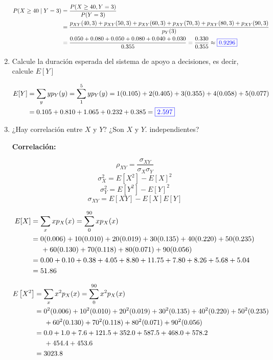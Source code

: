 \documentclass[12pt]{report}
\begin{document}
\begin{enumerate}
    \begin{align*}
      P(X \geq 40 \mid Y = 3) &= \frac{P(X \geq 40, Y = 3)}{P(Y = 3)} \\
      &= \frac{p_{XY}(40, 3) + p_{XY}(50, 3) + p_{XY}(60, 3) + p_{XY}(70, 3) + p_{XY}(80, 3) + p_{XY}(90, 3)}{p_Y(3)} \\
      &= \frac{0.050 + 0.080 + 0.050 + 0.080 + 0.040 + 0.030}{0.355} = \frac{0.330}{0.355} \approx {\color{blue}\boxed{0.9296}}
    \end{align*}

    \item Calcule la duración esperada del sistema de apoyo a decisiones, es decir, calcule $E[Y]$
    
    \begin{align*}
      E[Y] &= \sum_y yp_Y(y) = \sum_1^5 yp_Y(y) = 1(0.105) + 2(0.405) + 3(0.355) + 4(0.058) + 5(0.077) \\
      &= 0.105 + 0.810 + 1.065 + 0.232 + 0.385 = {\color{blue}\boxed{2.597}}
    \end{align*}

    \item ¿Hay correlación entre $X$ y $Y$? ¿Son $X$ y $Y$. independientes?
    
    \textbf{Correlación:}
    
    $$\rho_{XY} = \frac{\sigma_{XY}}{\sigma_X \sigma_Y}$$
    $$\sigma_X^2 = E\left[ X^2 \right] - E[X]^2$$
    $$\sigma_Y^2 = E\left[ Y^2 \right] - E[Y]^2$$
    $$\sigma_{XY} = E\left[ XY \right] - E[X]E[Y]$$

    \begin{align*}
      E[X] &= \sum_x xp_X(x) = \sum_0^{90} xp_X(x) \\
      &= 0(0.006) + 10(0.010) + 20(0.019) + 30(0.135) + 40(0.220) + 50(0.235) \\
      &\hspace*{0.5cm} + 60(0.130) + 70(0.118) + 80(0.071) + 90(0.056) \\
      &= 0.00 + 0.10 + 0.38 + 4.05 + 8.80 + 11.75 + 7.80 + 8.26 + 5.68 + 5.04 \\
      &= 51.86
    \end{align*}

    \begin{align*}
      E\left[ X^2 \right] &= \sum_x x^2p_X(x) = \sum_0^{90} x^2p_X(x) \\
      &= 0^2(0.006) + 10^2(0.010) + 20^2(0.019) + 30^2(0.135) + 40^2(0.220) + 50^2(0.235) \\
      &\hspace*{0.5cm} + 60^2(0.130) + 70^2(0.118) + 80^2(0.071) + 90^2(0.056) \\
      &= 0.0 + 1.0 + 7.6 + 121.5 + 352.0 + 587.5 + 468.0 + 578.2 \\
      &\hspace*{0.5cm}+ 454.4 + 453.6 \\
      &= 3023.8
    \end{align*}


\end{enumerate}
\end{document}
